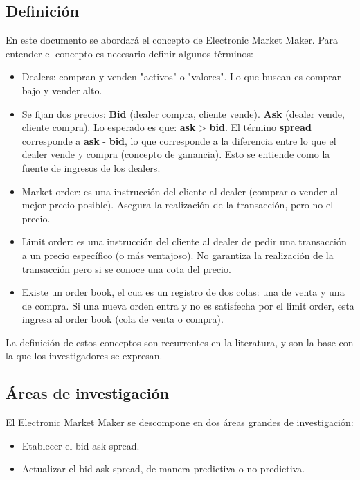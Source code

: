 \subsection{Definición}
En este documento se abordará el concepto de Electronic Market Maker. Para entender el concepto es necesario definir algunos términos: \cite{glosten1985bid}
\begin{itemize}
        \item Dealers: compran y venden "activos" o "valores". Lo que buscan es comprar bajo y vender alto.
        \item Se fijan dos precios: \textbf{Bid} (dealer compra, cliente vende). \textbf{Ask} (dealer vende, cliente compra). Lo esperado es que:
                \textbf{ask} > \textbf{bid}. El término \textbf{spread} corresponde a \textbf{ask} - \textbf{bid}, lo que corresponde a la diferencia entre lo que
                el dealer vende y compra (concepto de ganancia). Esto se entiende como la fuente de ingresos de los dealers. \cite{ho1981optimal}
        \item Market order: es una instrucción del cliente al dealer (comprar o vender al mejor precio posible). Asegura la realización de la transacción,
                pero no el precio.
        \item Limit order: es una instrucción del cliente al dealer de pedir una transacción a un precio específico (o más ventajoso).
                No garantiza la realización de la transacción pero si se conoce una cota del precio.
        \item Existe un order book, el cua es un registro de dos colas: una de venta y una de compra. Si una nueva orden entra y no es satisfecha por el limit order,
                esta ingresa al order book (cola de venta o compra).
\end{itemize}

La definición de estos conceptos son recurrentes en la literatura, y son la base con la que los investigadores se expresan.

\subsection{Áreas de investigación}
El Electronic Market Maker se descompone en dos áreas grandes de investigación:
\begin{itemize}
        \item Etablecer el bid-ask spread.
        \item Actualizar el bid-ask spread, de manera predictiva o no predictiva.
\end{itemize}


